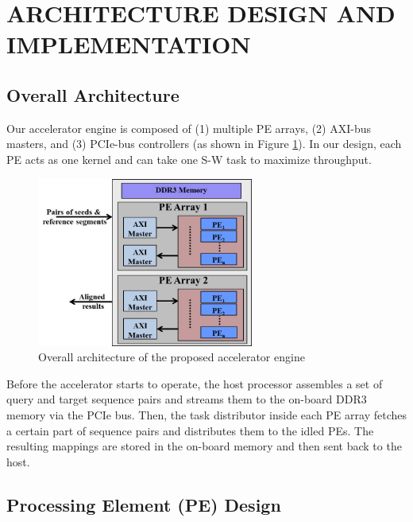 \section{ARCHITECTURE DESIGN AND IMPLEMENTATION} 
\label{sec:architecture}
\subsection{Overall Architecture}

Our accelerator engine is composed of (1) multiple PE arrays, (2) AXI-bus masters, and (3) PCIe-bus controllers (as shown in Figure \ref{fig:overall_architecture}).
In our design, each PE acts as one kernel and can take one S-W task to maximize throughput.

\begin{figure}[!hbt]
\begin{center}
\includegraphics[width=2.8in]{Figures/Figure_Arch1.jpg}
\caption {Overall architecture of the proposed accelerator engine} \label{fig:overall_architecture} \end{center} \end{figure}

Before the accelerator starts to operate, the host processor assembles a set of query and target sequence pairs and streams them to the on-board DDR3 memory via the PCIe bus. 
Then, the task distributor inside each PE array fetches a certain part of sequence pairs and distributes them to the idled PEs. 
The resulting mappings are stored in the on-board memory and then sent back to the host.

\subsection{Processing Element (PE) Design}

